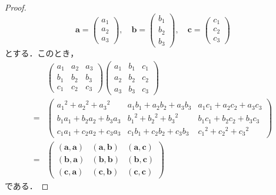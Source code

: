 \documentclass[uplatex,dvipdfmx,a4paper,11pt,fleqn]{jsarticle}
\begin{document}
\begin{tleftbar}
    \begin{proof}
    \[
    \bm{a}=\begin{pmatrix} a_1 \\ a_2 \\ a_3 \end{pmatrix},\quad \bm{b}=\begin{pmatrix} b_1 \\ b_2 \\ b_3 \end{pmatrix},\quad \bm{c}=\begin{pmatrix} c_1 \\ c_2 \\ c_3 \end{pmatrix}
    \]
    とする．このとき，
    \begin{align*}
        &
        \begin{pmatrix}
            a_1 & a_2 & a_3 \\
            b_1 & b_2 & b_3 \\
            c_1 & c_2 & c_3
        \end{pmatrix}
        \begin{pmatrix}
            a_1 & b_1 & c_1 \\
            a_2 & b_2 & c_2 \\
            a_3 & b_3 & c_3
        \end{pmatrix}
        \\
         =& \begin{pmatrix}
            {a_1}^2 +{a_2}^2 +{a_3}^2 & a_1 b_1 + a_2 b_2 + a_3 b_3 & a_1 c_1 + a_2 c_2 + a_3 c_3 \\
            b_1 a_1 + b_2 a_2 + b_3 a_3 & {b_1}^2 +{b_2}^2 + {b_3}^2 & b_1 c_1 + b_2 c_2 + b_3 c_3 \\
            c_1 a_1 + c_2 a_2 + c_3 a_3 & c_1 b_1 + c_2 b_2 + c_3 b_3 & {c_1}^2 +{c_2}^2 +{c_3}^2
        \end{pmatrix}
        \\
        =& \begin{pmatrix}
            (\bm{a},\bm{a}) & (\bm{a},\bm{b}) & (\bm{a},\bm{c}) \\
            (\bm{b},\bm{a}) & (\bm{b},\bm{b}) & (\bm{b},\bm{c}) \\
            (\bm{c},\bm{a}) & (\bm{c},\bm{b}) & (\bm{c},\bm{c})
        \end{pmatrix}
    \end{align*}
    である．


\end{proof}
\end{tleftbar}
\end{document}
